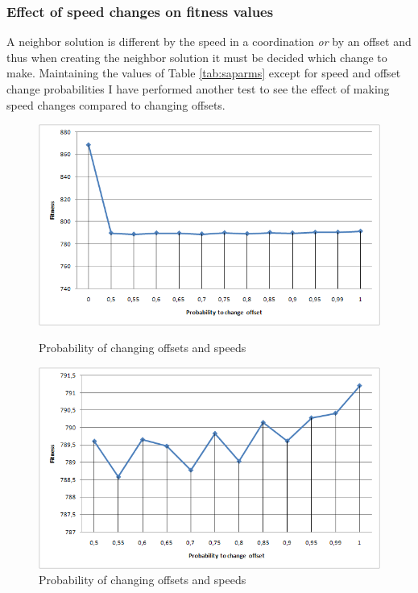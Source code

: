 \subsubsection*{Effect of speed changes on fitness values}
A neighbor solution is different by the speed in a coordination \textit{or} by an offset and thus when creating the neighbor solution it must be decided which change to make.
Maintaining the values of Table \ref{tab:saparms} except for speed and offset change probabilities I have performed another test to see the effect of making speed changes compared to changing offsets.

\begin{figure}[ht]

    \begin{minipage}[b]{0.5\linewidth}

\centering
\includegraphics[scale=0.25]{tuning_change_offset-speed_ratio0.png}
\caption{Probability of changing offsets and speeds}
\label{fig:offset-vs-speed0}

    \end{minipage}
    \hspace{0.5cm}
    \begin{minipage}[b]{0.5\linewidth}

\centering
\includegraphics[scale=0.25]{tuning_change_offset-speed_ratio.png}
\caption{Probability of changing offsets and speeds}
\label{fig:offset-vs-speed}

    \end{minipage}

\end{figure}

